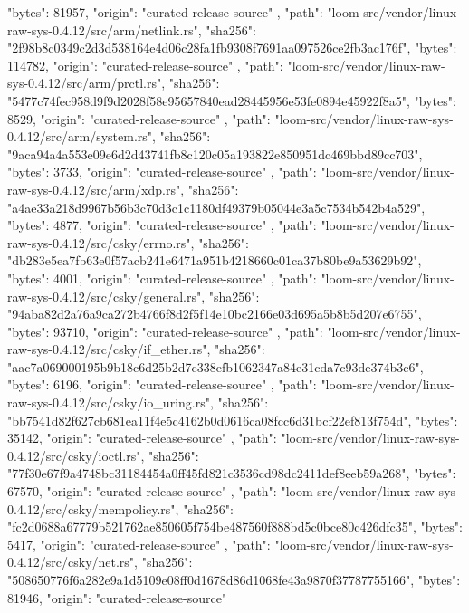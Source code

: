 {{      "bytes": 81957,
      "origin": "curated-release-source"
    },
    {
      "path": "loom-src/vendor/linux-raw-sys-0.4.12/src/arm/netlink.rs",
      "sha256": "2f98b8c0349c2d3d538164e4d06c28fa1fb9308f7691aa097526ce2fb3ac176f",
      "bytes": 114782,
      "origin": "curated-release-source"
    },
    {
      "path": "loom-src/vendor/linux-raw-sys-0.4.12/src/arm/prctl.rs",
      "sha256": "5477c74fec958d9f9d2028f58e95657840ead28445956e53fe0894e45922f8a5",
      "bytes": 8529,
      "origin": "curated-release-source"
    },
    {
      "path": "loom-src/vendor/linux-raw-sys-0.4.12/src/arm/system.rs",
      "sha256": "9aca94a4a553e09e6d2d43741fb8c120c05a193822e850951dc469bbd89cc703",
      "bytes": 3733,
      "origin": "curated-release-source"
    },
    {
      "path": "loom-src/vendor/linux-raw-sys-0.4.12/src/arm/xdp.rs",
      "sha256": "a4ae33a218d9967b56b3c70d3c1c1180df49379b05044e3a5c7534b542b4a529",
      "bytes": 4877,
      "origin": "curated-release-source"
    },
    {
      "path": "loom-src/vendor/linux-raw-sys-0.4.12/src/csky/errno.rs",
      "sha256": "db283e5ea7fb63e0f57acb241e6471a951b4218660c01ca37b80be9a53629b92",
      "bytes": 4001,
      "origin": "curated-release-source"
    },
    {
      "path": "loom-src/vendor/linux-raw-sys-0.4.12/src/csky/general.rs",
      "sha256": "94aba82d2a76a9ca272b4766f8d2f5f14e10bc2166e03d695a5b8b5d207e6755",
      "bytes": 93710,
      "origin": "curated-release-source"
    },
    {
      "path": "loom-src/vendor/linux-raw-sys-0.4.12/src/csky/if_ether.rs",
      "sha256": "aac7a069000195b9b18c6d25b2d7c338efb1062347a84e31cda7c93de374b3c6",
      "bytes": 6196,
      "origin": "curated-release-source"
    },
    {
      "path": "loom-src/vendor/linux-raw-sys-0.4.12/src/csky/io_uring.rs",
      "sha256": "bb7541d82f627cb681ea11f4e5c4162b0d0616ca08fcc6d31bcf22ef813f754d",
      "bytes": 35142,
      "origin": "curated-release-source"
    },
    {
      "path": "loom-src/vendor/linux-raw-sys-0.4.12/src/csky/ioctl.rs",
      "sha256": "77f30e67f9a4748bc31184454a0ff45fd821c3536cd98dc2411def8eeb59a268",
      "bytes": 67570,
      "origin": "curated-release-source"
    },
    {
      "path": "loom-src/vendor/linux-raw-sys-0.4.12/src/csky/mempolicy.rs",
      "sha256": "fc2d0688a67779b521762ae850605f754be487560f888bd5c0bce80c426dfc35",
      "bytes": 5417,
      "origin": "curated-release-source"
    },
    {
      "path": "loom-src/vendor/linux-raw-sys-0.4.12/src/csky/net.rs",
      "sha256": "508650776f6a282e9a1d5109e08ff0d1678d86d1068fe43a9870f37787755166",
      "bytes": 81946,
      "origin": "curated-release-source"
}}
